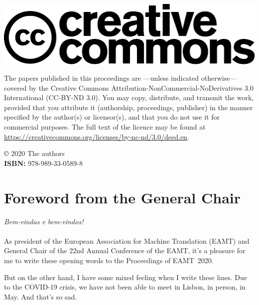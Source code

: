 \documentclass[a4paper,11pt,twoside]{book}
\newcommand{\newoddpage} {\clearpage
  \ifthenelse{\isodd{\value{page}}}{}
  {\thispagestyle{empty}\quad\newpage}}
\begin{document}
\newoddpage
\thispagestyle{empty}
\vfill \mbox{} \vfill

\noindent \includegraphics[scale=0.5]{logos/creative_commons.pdf} 

\noindent 
The papers published in this proceedings are ---unless indicated
otherwise--- covered by the Creative Commons
Attribution-NonCommercial-NoDerivatives 3.0 International (CC-BY-ND
3.0). You may copy, distribute, and transmit the work, provided that
you attribute it (authorship, proceedings, publisher) in the manner
specified by the author(s) or licensor(s), and that you do not use it
for commercial purposes. The full text of the licence may be found at
\url{https://creativecommons.org/licenses/by-nc-nd/3.0/deed.en}.

\vspace{1cm}

\noindent © 2020 The authors\\
\noindent \textbf{ISBN:} 978-989-33-0589-8\\


\vfill \mbox{}


\newoddpage
\frontmatter

\tableofcontents

\chapter*{Foreword from the General Chair}

\noindent
\emph{Bem-vindas e bem-vindos!}\\
\\

As president of the European Association for Machine Translation (EAMT) and General Chair of the 22nd Annual Conference of the EAMT, it's a pleasure for me to write these opening words to the Proceedings of EAMT~2020.

But on the other hand, I have some mixed feeling when I write these lines. Due to the COVID-19 crisis, we have not been able to meet in Lisbon, in person, in May. And that's so sad.
\end{document}
